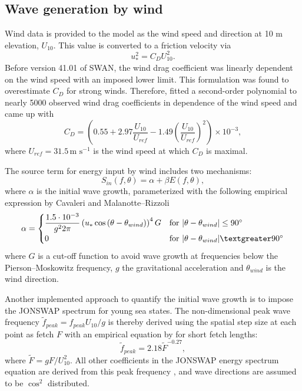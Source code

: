 \subsection{Wave generation by wind}

Wind data is provided to the model as the wind speed and direction at 10 m 
elevation, $U_{10}$. This value is converted to a friction velocity via
\begin{equation}
 u_\ast^2 = C_D U_{10}^2.
\end{equation}
Before version 41.01 of SWAN, the wind drag coefficient was linearly dependent 
on the wind speed with an imposed lower limit. This formulation was found to 
overestimate $C_D$ for strong winds. Therefore, \cite{zijlema2012} fitted a 
second-order polynomial to nearly 5000 observed wind drag coefficients in 
dependence of the wind speed and came up with 
\begin{equation}
 C_D = \left( 0.55 + 2.97 \dfrac{U_{10}}{U_{ref}} - 1.49 \left( 
\dfrac{U_{10}}{U_{ref}} \right)^2 \right) \times 10^{-3} ,
\end{equation}
where $U_{ref} = 31.5 \, \text{m s}^{-1}$ is the wind speed at which $C_D$ is 
maximal.

The source term for energy input by wind includes two mechanisms:
\begin{equation}\label{gen}
 S_{in} (f, \theta) = \alpha + \beta E(f,\theta),
\end{equation}
where $\alpha$ is the initial wave growth, parameterized with the following 
empirical expression by Cavaleri and Malanotte--Rizzoli
\begin{equation}
 \alpha = 
 \begin{cases}
  \dfrac{1.5 \cdot 10^{-3}}{g^2 2 \pi} \left(u_\ast \cos{(\theta - 
\theta_{wind})}\right)^4 G & \text{for } |\theta - \theta_{wind}| \le 90^\circ  
\\
  0 & \text{for } |\theta - \theta_{wind}| \textgreater 90^\circ  \\
 \end{cases}
\end{equation}
where $G$ is a cut-off function to avoid wave growth at frequencies below the 
Pierson--Moskowitz frequency, $g$ the gravitational acceleration and 
$\theta_{wind}$ is the wind direction. 

Another implemented approach to quantify the initial wave growth is to impose 
the JONSWAP spectrum for young sea states. The non-dimensional peak wave 
frequency $\tilde{f}_{peak} = f_{peak} U_{10} / g$ is thereby derived using the 
spatial step size at each point as fetch $F$ with an empirical equation by 
\cite{kahma1992} for short fetch lengths:
\begin{equation}
 \tilde{f}_{peak} = 2.18 \tilde{F}^{-0.27},
\end{equation}
where $\tilde{F} = g F / U_{10}^2$. All other coefficients in the JONSWAP energy 
spectrum equation are derived from this peak frequency 
\citep[][]{holthuijsen2007}, and  wave directions are assumed to be $\cos^2$ 
distributed.

